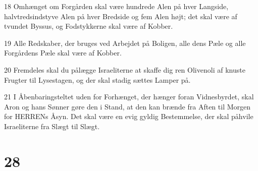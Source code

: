 \par 18 Omhænget om Forgården skal være hundrede Alen på hver Langside, halvtredsindstyve Alen på hver Bredside og fem Alen højt; det skal være af tvundet Byssus, og Fodstykkerne skal være af Kobber.
\par 19 Alle Redskaber, der bruges ved Arbejdet på Boligen, alle dens Pæle og alle Forgårdens Pæle skal være af Kobber.
\par 20 Fremdeles skal du pålægge Israeliterne at skaffe dig ren Olivenoli af knuste Frugter til Lysestagen, og der skal stadig sættes Lamper på.
\par 21 I Åbenbaringsteltet uden for Forhænget, der hænger foran Vidnesbyrdet, skal Aron og hans Sønner gøre den i Stand, at den kan brænde fra Aften til Morgen for HERRENs Åsyn. Det skal være en evig gyldig Bestemmelse, der skal påhvile Israeliterne fra Slægt til Slægt.

\chapter{28}

